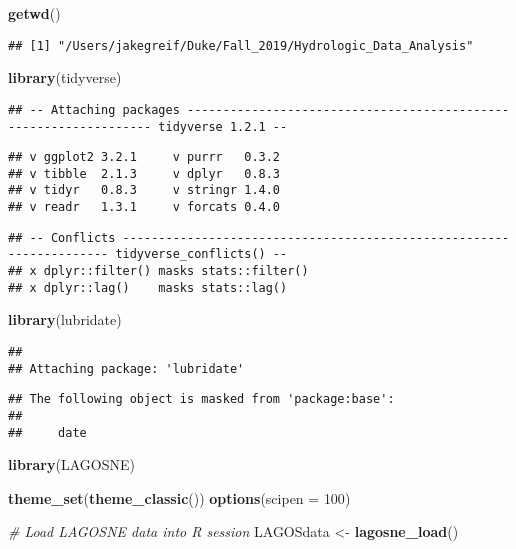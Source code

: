 \documentclass[]{article}
\newenvironment{Shaded}{\begin{snugshade}}{\end{snugshade}}
\newcommand{\CommentTok}[1]{\textcolor[rgb]{0.56,0.35,0.01}{\textit{#1}}}
\newcommand{\DataTypeTok}[1]{\textcolor[rgb]{0.13,0.29,0.53}{#1}}
\newcommand{\DecValTok}[1]{\textcolor[rgb]{0.00,0.00,0.81}{#1}}
\newcommand{\KeywordTok}[1]{\textcolor[rgb]{0.13,0.29,0.53}{\textbf{#1}}}
\newcommand{\NormalTok}[1]{#1}
\newcommand{\StringTok}[1]{\textcolor[rgb]{0.31,0.60,0.02}{#1}}
\begin{document}
\begin{Shaded}
\begin{Highlighting}[]
\KeywordTok{getwd}\NormalTok{()}
\end{Highlighting}
\end{Shaded}

\begin{verbatim}
## [1] "/Users/jakegreif/Duke/Fall_2019/Hydrologic_Data_Analysis"
\end{verbatim}

\begin{Shaded}
\begin{Highlighting}[]
\KeywordTok{library}\NormalTok{(tidyverse)}
\end{Highlighting}
\end{Shaded}

\begin{verbatim}
## -- Attaching packages ----------------------------------------------------------------- tidyverse 1.2.1 --
\end{verbatim}

\begin{verbatim}
## v ggplot2 3.2.1     v purrr   0.3.2
## v tibble  2.1.3     v dplyr   0.8.3
## v tidyr   0.8.3     v stringr 1.4.0
## v readr   1.3.1     v forcats 0.4.0
\end{verbatim}

\begin{verbatim}
## -- Conflicts -------------------------------------------------------------------- tidyverse_conflicts() --
## x dplyr::filter() masks stats::filter()
## x dplyr::lag()    masks stats::lag()
\end{verbatim}

\begin{Shaded}
\begin{Highlighting}[]
\KeywordTok{library}\NormalTok{(lubridate)}
\end{Highlighting}
\end{Shaded}

\begin{verbatim}
## 
## Attaching package: 'lubridate'
\end{verbatim}

\begin{verbatim}
## The following object is masked from 'package:base':
## 
##     date
\end{verbatim}

\begin{Shaded}
\begin{Highlighting}[]
\KeywordTok{library}\NormalTok{(LAGOSNE)}

\KeywordTok{theme_set}\NormalTok{(}\KeywordTok{theme_classic}\NormalTok{())}
\KeywordTok{options}\NormalTok{(}\DataTypeTok{scipen =} \DecValTok{100}\NormalTok{)}

\CommentTok{# Load LAGOSNE data into R session}
\NormalTok{LAGOSdata <-}\StringTok{ }\KeywordTok{lagosne_load}\NormalTok{()}
\end{Highlighting}
\end{Shaded}
\end{document}
